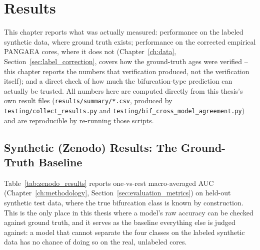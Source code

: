 \chapter{Results}
\label{ch:results}

This chapter reports what was actually measured: performance on the labeled synthetic data, where ground truth exists; performance on the corrected empirical PANGAEA cores, where it does not (Chapter~\ref{ch:data}, Section~\ref{sec:label_correction}, covers how the ground-truth ages were verified -- this chapter reports the numbers that verification produced, not the verification itself); and a direct check of how much the bifurcation-type prediction can actually be trusted. All numbers here are computed directly from this thesis's own result files (\texttt{results/summary/*.csv}, produced by \texttt{testing/collect\_results.py} and \texttt{testing/bif\_cross\_model\_agreement.py}) and are reproducible by re-running those scripts.

\section{Synthetic (Zenodo) Results: The Ground-Truth Baseline}
\label{sec:zenodo_results}

Table~\ref{tab:zenodo_results} reports one-vs-rest macro-averaged AUC (Chapter~\ref{ch:methodology}, Section~\ref{sec:evaluation_metrics}) on held-out synthetic test data, where the true bifurcation class is known by construction. This is the only place in this thesis where a model's raw accuracy can be checked against ground truth, and it serves as the baseline everything else is judged against: a model that cannot separate the four classes on the labeled synthetic data has no chance of doing so on the real, unlabeled cores.

